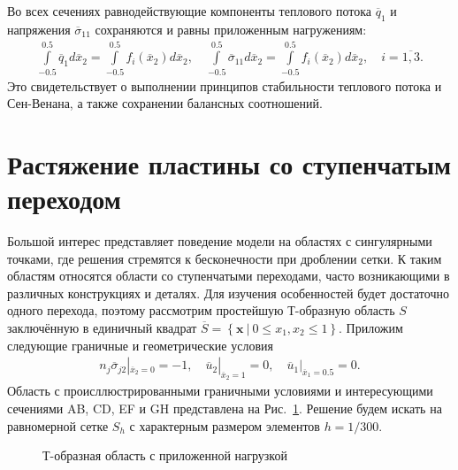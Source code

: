 Во всех сечениях равнодействующие компоненты теплового потока $\overline{q}_1$ и напряжения $\overline{\sigma}_{11}$ сохраняются и равны приложенным нагружениям:
\begin{gather*}
	\int\limits_{-0.5}^{0.5} \overline{q}_1 d\overline{x}_2 = 
	\int\limits_{-0.5}^{0.5} f_i (\overline{x}_2) d\overline{x}_2,
	\quad
	\int\limits_{-0.5}^{0.5} \overline{\sigma}_{11} d\overline{x}_2 = 
	\int\limits_{-0.5}^{0.5} f_i (\overline{x}_2) d\overline{x}_2,
	\quad	
	i = \overline{1,3}.
\end{gather*}
Это свидетельствует о выполнении принципов стабильности теплового потока и Сен-Венана, а также сохранении балансных соотношений.

\section{Растяжение пластины со ступенчатым переходом}\label{sec:ResultsAnalysis/TShape}

Большой интерес представляет поведение модели на областях с сингулярными точками, где решения стремятся к бесконечности при дроблении сетки. К таким областям относятся области со ступенчатыми переходами, часто возникающими в различных конструкциях и деталях. Для изучения особенностей будет достаточно одного перехода, поэтому рассмотрим простейшую Т-образную область $S$ заключённую в единичный квадрат $\overline{S} = \left\{ \boldsymbol{x} \ | \ 0 \leqslant x_1, x_2 \leqslant 1 \right\}$. Приложим следующие граничные и геометрические условия
\begin{gather*}
	n_j \overline{\sigma}_{j2} |_{\overline{x}_2 = 0} = -1,
	\quad
	\overline{u}_2 |_{\overline{x}_2 = 1} = 0,
	\quad
	\overline{u}_1 |_{\overline{x}_1 = 0.5} = 0.
\end{gather*}
Область с происллюстрированными граничными условиями и интересующими сечениями AB, CD, EF и GH представлена на Рис.~\ref{fig:TArea}. Решение будем искать на равномерной сетке $S_h$ с характерным размером элементов $h = 1/300$.

\begin{figure}[ht]
    \caption{Т-образная область с приложенной нагрузкой}
    \label{fig:TArea}
\end{figure}

